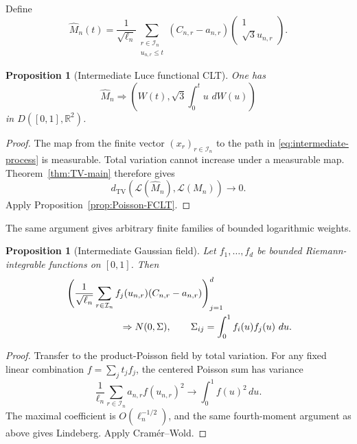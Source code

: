 \documentclass[11pt]{article}
\newtheorem{proposition}[theorem]{Proposition}
\theoremstyle{definition}
\theoremstyle{remark}
\newcommand{\dd}{\,d}
\newcommand{\TV}{\mathrm{TV}}
\newcommand{\cL}{\mathcal L}
\newcommand{\cI}{\mathcal I}
\newcommand{\R}{\mathbb R}
\begin{document}
Define
\begin{equation}\label{eq:intermediate-process}
 \widehat M_n(t)=\frac1{\sqrt{\ell_n}}
 \sum_{\substack{r\in\cI_n\\u_{n,r}\le t}}
 (C_{n,r}-a_{n,r})
 \begin{pmatrix}1\\ \sqrt3u_{n,r}\end{pmatrix}.
\end{equation}

\begin{proposition}[Intermediate Luce functional CLT]
\label{prop:Luce-intermediate-FCLT}
One has
\begin{equation}\label{eq:Luce-intermediate-FCLT}
 \widehat M_n\Rightarrow
 \left(W(t),\sqrt3\int_0^t u\,\dd W(u)\right)
\end{equation}
in $D([0,1],\R^2)$.
\end{proposition}

\begin{proof}
The map from the finite vector $(x_r)_{r\in\cI_n}$ to the path in
\eqref{eq:intermediate-process} is measurable.  Total variation cannot
increase under a measurable map.  Theorem~\ref{thm:TV-main} therefore gives
\[ d_{\TV}(\cL(\widehat M_n),\cL(M_n))\longrightarrow0.
\]
Apply Proposition~\ref{prop:Poisson-FCLT}.
\end{proof}

The same argument gives arbitrary finite families of bounded logarithmic
weights.

\begin{proposition}[Intermediate Gaussian field]
\label{prop:intermediate-field}
Let $f_1,\ldots,f_d$ be bounded Riemann-integrable functions on $[0,1]$.
Then
\begin{align}
 &\left(
 \frac1{\sqrt{\ell_n}}
 \sum_{r\in\cI_n}f_j(u_{n,r})(C_{n,r}-a_{n,r})
 \right)_{j=1}^d
 \notag\\
 &\hspace{2cm}\Rightarrow
 N(0,\Sigma),
 \qquad
 \Sigma_{ij}=\int_0^1f_i(u)f_j(u)\,\dd u.
 \label{eq:intermediate-field}
\end{align}
\end{proposition}

\begin{proof}
Transfer to the product-Poisson field by total variation.  For any fixed
linear combination $f=\sum_jt_jf_j$, the centered Poisson sum has variance
\[
 \frac1{\ell_n}\sum_{r\in\cI_n}a_{n,r}f(u_{n,r})^2
 \longrightarrow\int_0^1f(u)^2\dd u.
\]
The maximal coefficient is $O(\ell_n^{-1/2})$, and the same fourth-moment
argument as above gives Lindeberg.  Apply Cram\'er--Wold.
\end{proof}
\end{document}
